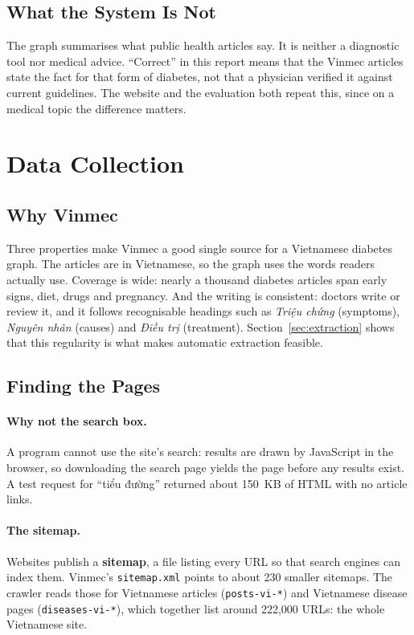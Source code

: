 \documentclass[11pt, a4paper]{article}
\newcommand{\code}[1]{\texttt{#1}}
\begin{document}
\subsection{What the System Is Not}

The graph summarises what public health articles say. It is neither a diagnostic tool nor medical advice. ``Correct'' in this report means that the Vinmec articles state the fact for that form of diabetes, not that a physician verified it against current guidelines. The website and the evaluation both repeat this, since on a medical topic the difference matters.

\section{Data Collection}
\label{sec:data}

\subsection{Why Vinmec}

Three properties make Vinmec a good single source for a Vietnamese diabetes graph. The articles are in Vietnamese, so the graph uses the words readers actually use. Coverage is wide: nearly a thousand diabetes articles span early signs, diet, drugs and pregnancy. And the writing is consistent: doctors write or review it, and it follows recognisable headings such as \emph{Triệu chứng} (symptoms), \emph{Nguyên nhân} (causes) and \emph{Điều trị} (treatment). Section~\ref{sec:extraction} shows that this regularity is what makes automatic extraction feasible.

\subsection{Finding the Pages}

\paragraph{Why not the search box.} A program cannot use the site's search: results are drawn by JavaScript in the browser, so downloading the search page yields the page before any results exist. A test request for ``tiểu đường'' returned about 150~KB of HTML with no article links.

\paragraph{The sitemap.} Websites publish a \textbf{sitemap}, a file listing every URL so that search engines can index them. Vinmec's \code{sitemap.xml} points to about 230 smaller sitemaps. The crawler reads those for Vietnamese articles (\code{posts-vi-*}) and Vietnamese disease pages (\code{diseases-vi-*}), which together list around 222,000 URLs: the whole Vietnamese site.
\end{document}

